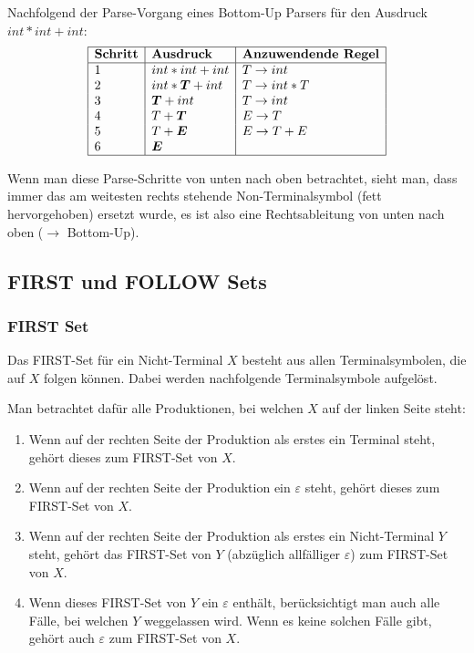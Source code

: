 Nachfolgend der Parse-Vorgang eines Bottom-Up Parsers für den Ausdruck $int * int + int$:
\[
	\begin{array}{|l|l|l|}
		\hline
		\textbf{Schritt} & \textbf{Ausdruck} & \textbf{Anzuwendende Regel} \\
		\hline
		1 & int * int + int & T \rightarrow int \\
		2 & int * \boldsymbol T + int & T \rightarrow int * T \\
		3 & \boldsymbol T + int & T \rightarrow int \\
		4 & T + \boldsymbol T & E \rightarrow T \\
		5 & T + \boldsymbol E & E \rightarrow T + E \\
		6 & \boldsymbol E & \\
		\hline
	\end{array}
\]

Wenn man diese Parse-Schritte von unten nach oben betrachtet, sieht man, dass immer das am weitesten
rechts stehende Non-Terminalsymbol (fett hervorgehoben) ersetzt wurde, es ist also eine
Rechtsableitung von unten nach oben ($\rightarrow$ Bottom-Up).


\subsection{FIRST und FOLLOW Sets}

\subsubsection{FIRST Set}

Das FIRST-Set für ein Nicht-Terminal $X$ besteht aus allen Terminalsymbolen, die auf $X$ folgen können.
Dabei werden nachfolgende Terminalsymbole aufgelöst.

Man betrachtet dafür alle Produktionen, bei welchen $X$ auf der linken Seite steht:

\begin{enumerate}
	\item Wenn auf der rechten Seite der Produktion als erstes ein Terminal steht, gehört dieses
		zum FIRST-Set von $X$.
	\item Wenn auf der rechten Seite der Produktion ein $\varepsilon$ steht, gehört dieses zum
		FIRST-Set von $X$.
	\item Wenn auf der rechten Seite der Produktion als erstes ein Nicht-Terminal $Y$ steht, gehört
		das FIRST-Set von $Y$ (abzüglich allfälliger $\varepsilon$) zum FIRST-Set von $X$.
	\item Wenn dieses FIRST-Set von $Y$ ein $\varepsilon$ enthält, berücksichtigt man auch alle Fälle,
		bei welchen $Y$ weggelassen wird. Wenn es keine solchen Fälle gibt, gehört auch
		$\varepsilon$ zum FIRST-Set von $X$.
\end{enumerate}

